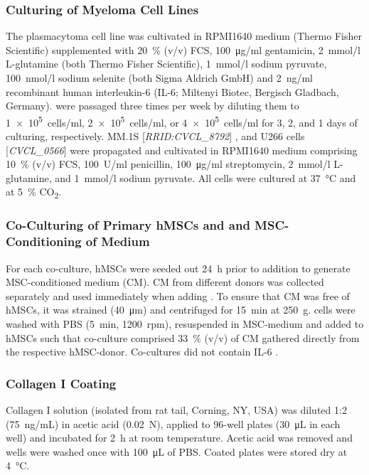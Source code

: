 \subsubsection*{Culturing of Myeloma Cell Lines}%
The plasmacytoma cell line  was
cultivated in RPMI1640 medium (Thermo Fisher Scientific) supplemented with
\SI{20}{\percent} (v/v) FCS, \SI{100}{\micro\gram/ml} gentamicin, \SI{2}{mmol/l}
L-glutamine (both Thermo Fisher Scientific), \SI{1}{mmol/l} sodium pyruvate,
\SI{100}{nmol/l} sodium selenite (both Sigma Aldrich GmbH) and \SI{2}{ng/ml}
recombinant human interleukin-6 (IL-6; Miltenyi Biotec, Bergisch Gladbach,
Germany). \INA were passaged three times per week by diluting them to
\SI{1e5}{cells/ml}, \SI{2e5}{cells/ml}, or \SI{4e5}{cells/ml} for 3, 2, and 1
days of culturing, respectively. MM.1S [\textit{RRID:CVCL\_8792}]
\cite{greensteinCharacterizationMMHuman2003}, and U266 cells
    [\textit{CVCL\_0566}] \cite{nilssonEstablishedImmunoglobulinProducing1970} were
propagated and cultivated in RPMI1640 medium comprising \SI{10}{\percent} (v/v)
FCS, \SI{100}{U/ml} penicillin, \SI{100}{\micro\gram/ml} streptomycin,
\SI{2}{mmol/l} L-glutamine, and \SI{1}{mmol/l} sodium pyruvate. All cells were
cultured at \SI{37}{\degreeCelsius} and at \SI{5}{\percent} CO\textsubscript{2}.


\subsubsection*{Co-Culturing of Primary hMSCs and \INA and MSC-Conditioning of Medium}
For each co-culture, hMSCs were seeded out \SI{24}{\hour} prior to \INA
addition to generate MSC-conditioned medium (CM). CM from different donors was
collected separately and used immediately when adding \INA. To ensure that CM
was free of hMSCs, it was strained (\SI{40}{\micro\meter}) and centrifuged for
\SI{15}{\minute} at \SI{250}{g}. \INA cells were washed with PBS
(\SI{5}{\minute}, \SI{1200}{rpm}), resuspended in MSC-medium and added to hMSCs
such that co-culture comprised \SI{33}{\percent} (v/v) of CM gathered directly
from the respective hMSC-donor. Co-cultures did not contain IL-6
\cite{chatterjeePresenceBoneMarrow2002}.


\subsubsection*{Collagen I Coating}
Collagen I solution (isolated from rat tail, Corning, NY, USA) was diluted 1:2
(\SI{75}{ng/mL}) in acetic acid (\SI{0.02}{N}), applied to 96-well plates
(\SI{30}{\micro\liter} in each well) and incubated for \SI{2}{\hour} at room
temperature. Acetic acid was removed and wells were washed once with
\SI{100}{\micro\liter} of PBS. Coated plates were stored dry at
\SI{4}{\degreeCelsius}.


